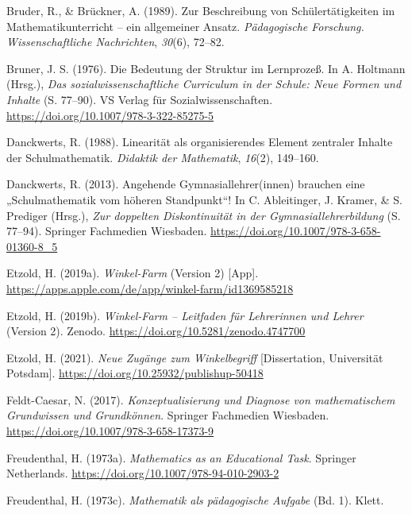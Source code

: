 \documentclass[
]{scrbook}
\newlength{\cslhangindent}
\newenvironment{CSLReferences}[2] %
 {\begin{list}{}{%
  \setlength{\itemindent}{0pt}
  \setlength{\leftmargin}{0pt}
  \setlength{\parsep}{0pt}
  \ifodd #1
   \setlength{\leftmargin}{\cslhangindent}
   \setlength{\itemindent}{-1\cslhangindent}
  \fi
  \setlength{\itemsep}{#2\baselineskip}}}
 {\end{list}}
\theoremstyle{definition}
\theoremstyle{definition}
\theoremstyle{definition}
\theoremstyle{definition}
\theoremstyle{remark}
\begin{document}
\begin{CSLReferences}{1}{0}
Bruder, R., \& Brückner, A. (1989). Zur {Beschreibung} von {Schülertätigkeiten} im {Mathematikunterricht} -- ein allgemeiner {Ansatz}. \emph{Pädagogische Forschung. Wissenschaftliche Nachrichten}, \emph{30}(6), 72--82.

Bruner, J. S. (1976). Die {Bedeutung} der {Struktur} im {Lernprozeß}. In A. Holtmann (Hrsg.), \emph{Das sozialwissenschaftliche {Curriculum} in der {Schule}: {Neue} {Formen} und {Inhalte}} (S. 77--90). VS Verlag für Sozialwissenschaften. \url{https://doi.org/10.1007/978-3-322-85275-5}

Danckwerts, R. (1988). Linearität als organisierendes Element zentraler Inhalte der Schulmathematik. \emph{Didaktik der Mathematik}, \emph{16}(2), 149--160.

Danckwerts, R. (2013). Angehende {Gymnasiallehrer}(innen) brauchen eine „{Schulmathematik} vom höheren {Standpunkt}``! In C. Ableitinger, J. Kramer, \& S. Prediger (Hrsg.), \emph{Zur doppelten {Diskontinuität} in der {Gymnasiallehrerbildung}} (S. 77--94). Springer Fachmedien Wiesbaden. \url{https://doi.org/10.1007/978-3-658-01360-8_5}

Etzold, H. (2019a). \emph{Winkel-{Farm}} (Version 2) {[}App{]}. \url{https://apps.apple.com/de/app/winkel-farm/id1369585218}

Etzold, H. (2019b). \emph{Winkel-{Farm} -- {Leitfaden} für {Lehrerinnen} und {Lehrer}} (Version 2). Zenodo. \url{https://doi.org/10.5281/zenodo.4747700}

Etzold, H. (2021). \emph{Neue Zugänge zum Winkelbegriff} {[}Dissertation, Universität Potsdam{]}. \url{https://doi.org/10.25932/publishup-50418}

Feldt-Caesar, N. (2017). \emph{Konzeptualisierung und {Diagnose} von mathematischem {Grundwissen} und {Grundkönnen}}. Springer Fachmedien Wiesbaden. \url{https://doi.org/10.1007/978-3-658-17373-9}

Freudenthal, H. (1973a). \emph{Mathematics as an {Educational} {Task}}. Springer Netherlands. \url{https://doi.org/10.1007/978-94-010-2903-2}

Freudenthal, H. (1973c). \emph{Mathematik als pädagogische {Aufgabe}} (Bd. 1). Klett.


\end{CSLReferences}
\end{document}
